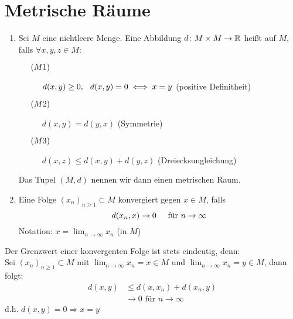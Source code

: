 
\section{Metrische R{\"a}ume}

\begin{definition}
	\begin{enumerate}[label=\alph*\upshape)]
		\item Sei $M$ eine nichtleere Menge. Eine Abbildung $d \colon M \times M \rightarrow 	\mathbb{R}$ hei{\ss}t  auf $M$, falls $\forall x, y, z \in M:$
			\begin{description}
				\item[$\hspace{0.5cm} (M1) \hspace{0.1cm} $] $d(x, y) \geq 0, \hspace{0.25cm} d(x, y) = 0 \iff x = y $  (positive Definitheit)
				\item[$\hspace{0.5cm} (M2) \hspace{0.1cm} $] $d(x, y) = d(y, x)$  (Symmetrie)
				\item[$\hspace{0.5cm} (M3) \hspace{0.1cm} $] $d(x, z) \leq d(x, y) + d(y, z)$  (Dreiecksungleichung)
			\end{description}
			Das Tupel $(M, d)$ nennen wir dann einen metrischen Raum. 
		\item Eine Folge $(x_{n})_{n \geq 1} \subset M$ konvergiert gegen $x \in M$, falls
			\[ d(x_{n}, x) \rightarrow 0 \hspace{0.5cm} \text{für } n \rightarrow \infty \]	 
			Notation: $x = \lim_{n \rightarrow \infty} x_{n}$ (in $M$)
	\end{enumerate}
\end{definition}


\begin{bemerkung*}
	Der Grenzwert einer konvergenten Folge ist stets eindeutig, denn: \\
	Sei $(x_{n})_{n \geq  1} \subset M$ mit $\lim_{n \rightarrow \infty} x_{n} = x \in M$ und $\lim_{n \rightarrow \infty} x_{n} = y \in M$, dann folgt: 
	\begin{align*}
		d(x, y) & \leq d(x, x_{n}) + d(x_{n}, y) \\
				& \rightarrow 0 \text{ für } n \rightarrow \infty
	\end{align*}
	d.h. $d(x, y) = 0 \Rightarrow x = y$
\end{bemerkung*}


